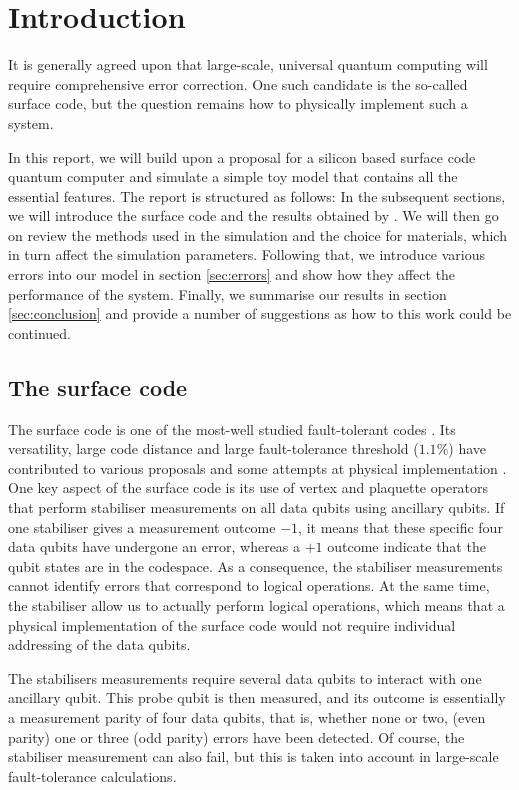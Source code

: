 \section{Introduction} \label{sec:Introduction}

It is generally agreed upon that large-scale, universal quantum computing will require comprehensive error correction. One such candidate is the so-called surface code, but the question remains how to physically implement such a system. 

In this report, we will build upon a proposal for a silicon based surface code quantum computer \cite{OGorman2016} and simulate a simple toy model that contains all the essential features. 
The report is structured as follows: In the subsequent sections, we will introduce the surface code and the results obtained by \citet{OGorman2016}. We will then go on review the methods used in the simulation and the choice for materials, which in turn affect the simulation parameters. Following that, we introduce various errors into our model in section \ref{sec:errors} and show how they affect the performance of the system. Finally, we summarise our results in section \ref{sec:conclusion} and provide a number of suggestions as how to this work could be continued. 

\subsection{The surface code}
The surface code is one of the most-well studied fault-tolerant codes \cite{Wang2011,Fowler2012}. Its versatility, large code distance and large fault-tolerance threshold ($1.1\%$) have contributed to various proposals \cite{Fowler2012,Pica2014,Tosi2015,Hill2015,OGorman2016} and some attempts at physical implementation \cite{Barends2014,Kelly2015}. One key aspect of the surface code is its use of vertex and plaquette operators that perform stabiliser measurements on all data qubits using ancillary qubits. If one stabiliser gives a measurement outcome $-1$, it means that these specific four data qubits have undergone an error, whereas a $+1$ outcome indicate that the qubit states are in the codespace. As a consequence, the stabiliser measurements cannot identify errors that correspond to logical operations. At the same time, the stabiliser allow us to actually perform logical operations, which means that a physical implementation of the surface code would not require individual addressing of the data qubits. 

The stabilisers measurements require several data qubits to interact with one ancillary qubit. This probe qubit is then measured, and its outcome is essentially  a measurement parity of four data qubits, that is, whether none or two,  (even parity) one  or three (odd parity) errors have been detected. Of course, the stabiliser measurement can also fail, but this is taken into account in large-scale fault-tolerance calculations. 




